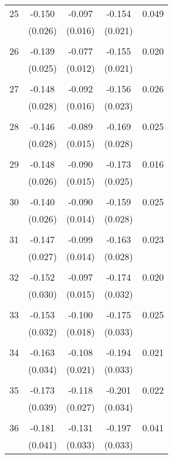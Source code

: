 \begin{tabular}{l*{1}{cccc}}
  25       & -0.150 & -0.097 & -0.154 & 0.049 \\
          & (0.026) & (0.016) & (0.021) & \\
 & & & &\\
  26       & -0.139 & -0.077 & -0.155 & 0.020 \\
          & (0.025) & (0.012) & (0.021) & \\
 & & & &\\
  27       & -0.148 & -0.092 & -0.156 & 0.026 \\
          & (0.028) & (0.016) & (0.023) & \\
 & & & &\\
  28       & -0.146 & -0.089 & -0.169 & 0.025 \\
          & (0.028) & (0.015) & (0.028) & \\
 & & & &\\
  29       & -0.148 & -0.090 & -0.173 & 0.016 \\
          & (0.026) & (0.015) & (0.025) & \\
 & & & &\\
  30       & -0.140 & -0.090 & -0.159 & 0.025 \\
          & (0.026) & (0.014) & (0.028) & \\
 & & & &\\
  31       & -0.147 & -0.099 & -0.163 & 0.023 \\
          & (0.027) & (0.014) & (0.028) & \\
 & & & &\\
  32       & -0.152 & -0.097 & -0.174 & 0.020 \\
          & (0.030) & (0.015) & (0.032) & \\
 & & & &\\
  33       & -0.153 & -0.100 & -0.175 & 0.025 \\
          & (0.032) & (0.018) & (0.033) & \\
 & & & &\\
  34       & -0.163 & -0.108 & -0.194 & 0.021 \\
          & (0.034) & (0.021) & (0.033) & \\
 & & & &\\
  35       & -0.173 & -0.118 & -0.201 & 0.022 \\
          & (0.039) & (0.027) & (0.034) & \\
 & & & &\\
  36       & -0.181 & -0.131 & -0.197 & 0.041 \\
          & (0.041) & (0.033) & (0.033) & \\

\end{tabular}
